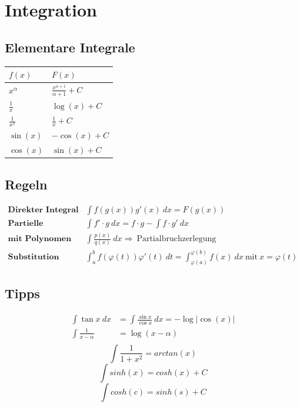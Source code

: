 \documentclass[11pt]{article}
\begin{document}
\section{Integration}

\subsection{Elementare Integrale}

\begin{table}[H]
\centering
\begin{tabular}{|l|l|}
\hline
$f(x)$ & $F(x)$ \\ \hline
$x^\alpha$ & $\frac{x^{\alpha+1}}{\alpha+1} + C$ \\ \hline
$\frac{1}{x}$ & $\log (x) + C$ \\ \hline
$\frac{1}{x^2}$ & $\frac{1}{x} + C$ \\ \hline
$\sin(x)$ & $-\cos(x) + C$ \\ \hline
$\cos(x)$ & $\sin(x) + C$ \\ \hline
\end{tabular}
\end{table}

\subsection{Regeln}

\begin{equation*}
\begin{split}
	\textbf{Direkter Integral}\quad & \int f(g(x))g'(x)\ dx = F(g(x)) \\
	\textbf{Partielle Integration}\quad & \int f' \cdot g\ dx = f \cdot g - \int f \cdot g'\ dx \\
	\textbf{mit Polynomen}\quad & \int\frac{p(x)}{q(x)}\ dx \Rightarrow\ \text{Partialbruchzerlegung} \\
	\textbf{Substitution}\quad & \int_a^b f(\varphi(t))\varphi'(t)\ dt = \int_{\varphi(a)}^{\varphi(b)} f(x)\ dx\ \text{mit}\ x = \varphi(t)
\end{split}
\end{equation*}

\subsection{Tipps}

\begin{equation*}
\begin{split}
	\int\tan x\ dx & = \int\frac{\sin x}{\cos x}\ dx = -\log|\cos(x)| \\
	\int \frac{1}{x - \alpha} & = \log(x-\alpha) \\
\end{split}
\end{equation*}
\begin{equation*}
	\int\frac{1}{1+x^2}=arctan(x)
\end{equation*}
\begin{equation*}
	\int sinh(x)=cosh(x) + C
\end{equation*}
\begin{equation*}
	\int cosh(c)=sinh(s) + C
\end{equation*}
\end{document}
